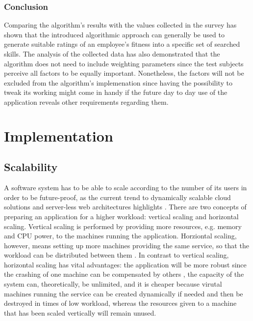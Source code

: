 \subsubsection{Conclusion}
Comparing the algorithm's results with the values collected in the survey has shown that the introduced algorithmic approach can generally be used to generate
suitable ratings of an employee's fitness into a specific set of searched skills.
The analysis of the collected data has also demonstrated that the algorithm
does not need to include weighting parameters since the test subjects perceive all factors to be equally important. Nonetheless, the factors will not be excluded from the algorithm's implemenation since having the possibility to tweak its working might come in handy if the future day to day use of the application reveals other requirements regarding them.

\newpage


\section{Implementation}
\subsection{Scalability}
\label{scale}
A software system has to be able to scale according to the number of its users in order to be future-proof, as the current trend to dynamically scalable cloud solutions and server-less web architectures highlights \cite{allthecloud}. There are two concepts of preparing an application for a higher workload: vertical scaling and horizontal scaling. Vertical scaling is performed by providing more resources, e.g. memory and CPU power, to the machines running the application. Horziontal scaling, however, means setting up more machines providing the same service, so that the workload can be distributed between them \cite{hvscale}. In contrast to vertical scaling, horizontal scaling has vital advantages: the application will be more robust since the crashing of one machine can be compensated by others \cite{fedi}, the capacity of the system can, theoretically, be unlimited, and it is cheaper because virutal machines running the service can be created dynamically if needed and then be destroyed in times of low workload, whereas the resources given to a machine that has been scaled vertically will remain unused.

